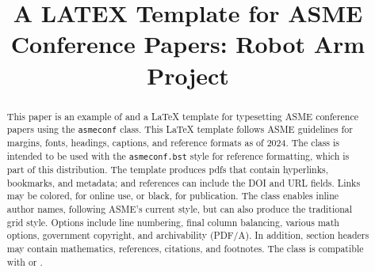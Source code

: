 \title{A LATEX Template for ASME Conference Papers: } %
    \title{Robot Arm Project}


\maketitle




\begin{abstract}

This paper is an example of and a  {\upshape\LaTeX} template for typesetting ASME conference papers using the {\upshape\texttt{asmeconf}} class. This  {\upshape\LaTeX} template follows ASME guidelines for margins, fonts, headings, captions, and reference formats as of 2024. The class is intended to be used with the {\upshape\texttt{asmeconf.bst} } style for reference formatting, which is part of this distribution. The template produces pdfs that contain hyperlinks, bookmarks, and metadata; and references can include the DOI and URL fields. Links may be colored, for online use, or black, for publication. The class enables inline author names, following ASME's current style, but can also produce the traditional grid style. Options include line numbering, final column balancing, various math options, government copyright, and archivability (PDF/A). In addition, section headers may contain mathematics, references, citations, and footnotes. The class is compatible with {\upshape{}} or {\upshape{}}.
\end{abstract}





